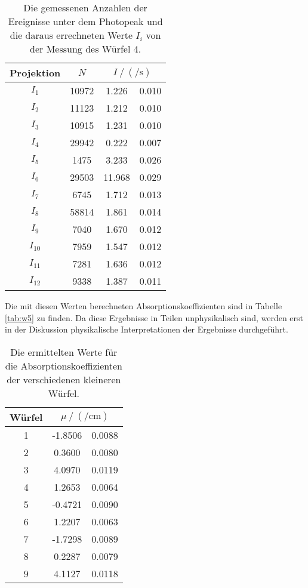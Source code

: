     \begin{table}[H]
    \centering
    \caption{Die gemessenen Anzahlen der Ereignisse unter dem Photopeak und die daraus errechneten Werte $I_i$ von der Messung des Würfel 4.}
    \label{tab:w4}
    \begin{tabular}{c S[table-format=4.0] S[table-format=2.3] @{${}\pm{}$} S[table-format=1.3] }
      \toprule
      {Projektion} &  &  \\
      \midrule
      $I_1 $   &  10972 & 1.226 & 0.010 \\
      $I_2 $   &  11123 & 1.212 & 0.010\\
      $I_3 $   &  10915 & 1.231 & 0.010\\
      $I_4 $   &  29942 & 0.222 & 0.007\\
      $I_5 $   &   1475 & 3.233 & 0.026\\
      $I_6 $   &  29503 & 11.968& 0.029 \\
      $I_7 $   &   6745 & 1.712 & 0.013\\
      $I_8 $   &  58814 & 1.861 & 0.014\\
      $I_9 $   &   7040 & 1.670 & 0.012\\
      $I_{10}$ &   7959 & 1.547 & 0.012\\
      $I_{11}$ &   7281 & 1.636 & 0.012\\
      $I_{12}$ &   9338 & 1.387 & 0.011\\
      \bottomrule
    \end{tabular}
  \end{table}
  \noindent
  Die mit diesen Werten berechneten Absorptionskoeffizienten sind in Tabelle \ref{tab:w5} zu finden.
  Da diese Ergebnisse in Teilen unphysikalisch sind, werden erst in der Diskussion physikalische Interpretationen der Ergebnisse durchgeführt.

  \begin{table}[H]
    \centering
    \caption{Die ermittelten Werte für die Absorptionskoeffizienten der verschiedenen kleineren Würfel.}
    \label{tab:mu4}
    \begin{tabular}{c S[table-format=3.4] @{${}\pm{}$} S[table-format=1.4] }
      \toprule
      {Würfel} &   \\
       & -1.8506& 0.0088 \\
      2 & 0.3600 & 0.0080 \\
      3 & 4.0970 & 0.0119 \\
      4 & 1.2653 & 0.0064 \\
      5 & -0.4721& 0.0090 \\
      6 & 1.2207 & 0.0063 \\
      7 & -1.7298& 0.0089 \\
      8 & 0.2287 & 0.0079 \\
      9 & 4.1127 & 0.0118 \\
      \bottomrule
    \end{tabular}
  \end{table}